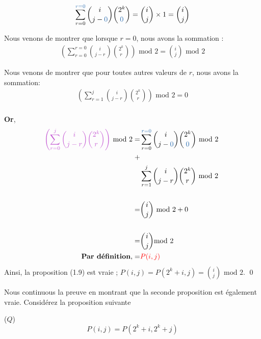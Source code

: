 \documentclass[16pt]{report}
\begin{document}
\begin{multicols*}{2}
\begin{Preuve*}{}{}
       \begin{align}
              \sum_{r=0}^{\textcolor{myb}{r=0}} {i \choose j - \textcolor{myb}{0}} {2^k \choose \textcolor{myb}{0}} = 
              {i \choose j} \times 1  = {i \choose j}
       \end{align}

            Nous venons de montrer que lorsque $r = 0$, nous avons la sommation :  
              \begin{align*}
                  \left( \sum_{r=0}^{r=0} {i \choose j-r} {2^k \choose r} \right) \text{ mod 2}
                  = {i \choose j} \text{ mod 2}
            \end{align*}  

            Nous venons de montrer que pour toutes autres valeurs de $r$, 
            nous avons la sommation:  
              \begin{align*}
                  \left( \sum_{r=1}^{j} {i \choose j-r} {2^k \choose r} \right) \text{ mod 2}
                  = 0  
            \end{align*}  
            \vspace{1em} \\ 
            \textbf{Or},   
              \begin{align*}
                  \textcolor{myp}{\left( \sum_{r=0}^{j} {i \choose j-r} {2^k \choose r} \right)} \text{ mod 2}
         = &\sum_{r=0}^{\textcolor{myb}{r=0}} {i \choose j - \textcolor{myb}{0}} {2^k \choose \textcolor{myb}{0}} 
         \text{ mod 2} \\ + \\ 
           &\sum_{r=1}^{j} {i \choose j-r} {2^k \choose r} \text{ mod 2 } \\ \\ 
         = &{i \choose j}\text{ mod 2} + 0\\   \\ 
         = &{i \choose j} \text{mod 2} \\ 
         \textbf{Par définition}\text{,} = &\textcolor{red}{P(i, j)}
            \end{align*} 
        Ainsi, la proposition (1.9) est vraie ; $P(i,j) = P(2^k +i, j) = {i \choose j} \text{ mod 2}$. \qed
        \end{Preuve*}
        \columnbreak
        Nous continuous la preuve en montrant que la seconde proposition est également vraie. 
        Considérez la proposition suivante 
        \begin{prop}{($Q$)}{}
            \[ P(i, j) = P(2^k +i, 2^k + j) \]

\end{prop}
\end{multicols*}
\end{document}
